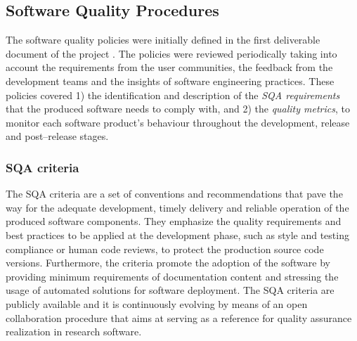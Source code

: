 \subsection{Software Quality Procedures}\label{software-quality-procedures}
\label{subsec:sqa}

The software quality policies were initially defined in the first deliverable document of the
project \cite{indigo-d31}. The policies were reviewed periodically taking into account the requirements
from the user communities, the feedback from the development teams and the insights of software
engineering practices. These policies covered 1) the identification
and description of the \emph{SQA requirements} that the produced software needs
to comply with, and 2) the \emph{quality metrics}, to monitor each software product's
behaviour throughout the development, release and post--release stages.

\subsubsection{SQA criteria}

The SQA criteria are a set of conventions and recommendations that pave the way for
the adequate development, timely delivery and reliable operation of the produced software components.
They emphasize the quality requirements and best practices to be applied at the
development phase, such as style and testing compliance or human code reviews, to protect the
production source code versions. Furthermore, the criteria promote the adoption of the software
by providing minimum requirements of documentation content and stressing the usage of automated
solutions for software deployment. The SQA criteria are publicly available \cite{sqa-baseline} and
it is continuously evolving by means of an open collaboration procedure \cite{sqa-baseline-repo}
that aims at serving as a reference for quality assurance realization in research software.

